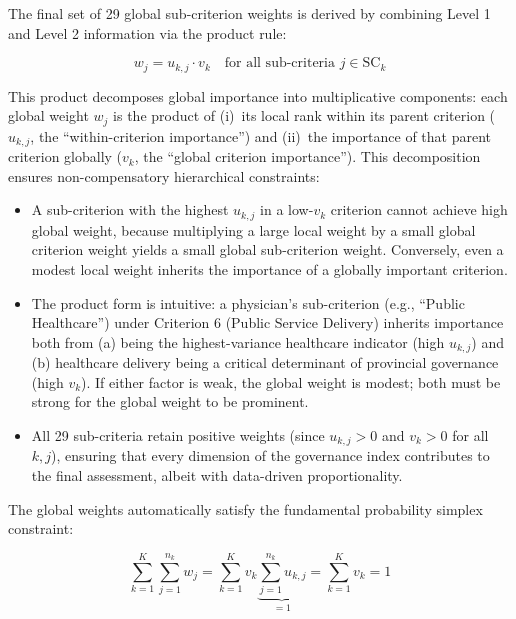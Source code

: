 \documentclass[12pt,a4paper]{article}
\begin{document}
The final set of 29 global sub-criterion weights is derived by combining Level 1 and Level 2 information via the product rule:

\begin{equation}
\label{eq:global_weights}
w_j = u_{k,j} \cdot v_k \quad \text{for all sub-criteria } j \in \text{SC}_k
\end{equation}

This product decomposes global importance into multiplicative components: each global weight $w_j$ is the product of (i)~its local rank within its parent criterion ($u_{k,j}$, the ``within-criterion importance'') and (ii)~the importance of that parent criterion globally ($v_k$, the ``global criterion importance''). This decomposition ensures non-compensatory hierarchical constraints:

\begin{itemize}[itemsep=3pt]
  \item A sub-criterion with the highest $u_{k,j}$ in a low-$v_k$ criterion cannot achieve high global weight, because multiplying a large local weight by a small global criterion weight yields a small global sub-criterion weight. Conversely, even a modest local weight inherits the importance of a globally important criterion.
  
  \item The product form is intuitive: a physician's sub-criterion (e.g., ``Public Healthcare'') under Criterion 6 (Public Service Delivery) inherits importance both from (a) being the highest-variance healthcare indicator (high $u_{k,j}$) and (b) healthcare delivery being a critical determinant of provincial governance (high $v_k$). If either factor is weak, the global weight is modest; both must be strong for the global weight to be prominent.
  
  \item All 29 sub-criteria retain positive weights (since $u_{k,j} > 0$ and $v_k > 0$ for all $k, j$), ensuring that every dimension of the governance index contributes to the final assessment, albeit with data-driven proportionality.
\end{itemize}

The global weights automatically satisfy the fundamental probability simplex constraint:

\begin{equation}
\label{eq:simplex_proof}
\sum_{k=1}^{K} \sum_{j=1}^{n_k} w_j = \sum_{k=1}^{K} v_k \underbrace{\sum_{j=1}^{n_k} u_{k,j}}_{= 1} = \sum_{k=1}^{K} v_k = 1
\end{equation}
\end{document}
